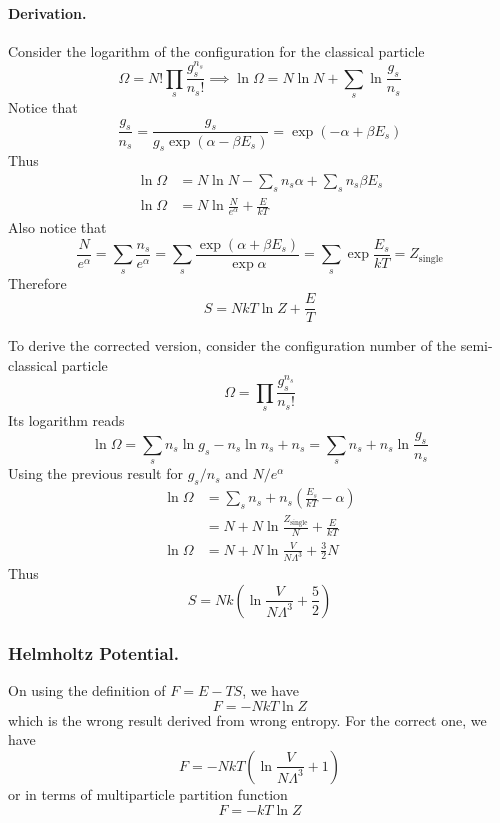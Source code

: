 \documentclass[../../../Main.tex]{subfiles}
\begin{document}
\paragraph*{Derivation.} Consider the logarithm of the configuration for the classical particle
\begin{equation*}
	\Omega=N!\prod_s \frac{g_s^{n_s}}{n_s!}\implies
	\ln \Omega=N\ln N +\sum_s\ln\frac{g_s}{n_s}
\end{equation*}
Notice that
\begin{equation*}
	\frac{g_s}{n_s}=\frac{g_s}{g_s\exp(\alpha-\beta E_s)}=\exp(-\alpha+\beta E_s)
\end{equation*}
Thus
\begin{align*}
	\ln \Omega & =N\ln N -\sum_sn_s\alpha +\sum_sn_s\beta E_s \\
	\ln\Omega  & = N\ln \frac{N}{e^\alpha}+\frac{E}{kT}
\end{align*}
Also notice that
\begin{equation*}
	\frac{N}{e^\alpha}=\sum_s\frac{n_s}{e^\alpha}=\sum_s\frac{\exp(\alpha+\beta E_s)}{\exp\alpha}=\sum_s\exp \frac{E_s}{kT}=Z_\text{single}
\end{equation*}
Therefore
\begin{equation*}
	S=NkT\ln Z+\frac{E}{T}
\end{equation*}

To derive the corrected version, consider the configuration number of the semi-classical particle
\begin{equation*}
	\Omega=\prod_s \frac{g_s^{n_s}}{n_s!}
\end{equation*}
Its logarithm reads
\begin{equation*}
	\ln \Omega=\sum_s n_s\ln g_s-n_s\ln n_s +n_s=\sum_s n_s+n_s\ln\frac{g_s}{n_s}
\end{equation*}
Using the previous result for $g_s/n_s$ and $N/e^\alpha$
\begin{align*}
	\ln \Omega & = \sum_s n_s+n_s\left(\frac{E_s}{kT}-\alpha\right) \\
	           & = N+ N\ln\frac{Z_\text{single}}{N}+\frac{E}{kT}    \\
	\ln \Omega & = N+ N\ln\frac{V}{N\Lambda^3}+\frac{3}{2}N
\end{align*}
Thus
\begin{equation*}
	S=Nk\left(\ln\frac{V}{N\Lambda^3}+\frac{5}{2}\right)
\end{equation*}

\subsubsection*{Helmholtz Potential.} On using the definition of $F=E-TS$, we have
\begin{equation*}
	F=-NkT\ln Z
\end{equation*}
which is the wrong result derived from wrong entropy. For the correct one, we have
\begin{equation*}
	F=-NkT\left(\ln \frac{V}{N\Lambda^3}+1\right)
\end{equation*}
or in terms of multiparticle partition function
\begin{equation*}
	F=-kT\ln Z
\end{equation*}
\end{document}

